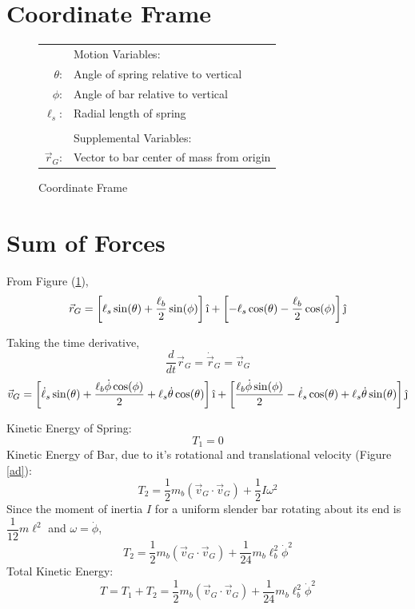 \documentclass[12pt]{report}
\begin{document}
\begin{flushleft}
\section{Coordinate Frame} \label{section:coord}
\begin{figure}[!htp]
    \begin{minipage}[c]{.4\textwidth}
      \center
      
      \caption{Coordinate Frame}
      \label{coord}
      \vspace{2ex}
    \end{minipage}%
    \begin{minipage}[c]{.6\textwidth}
      \center
      \begin{tabular}{rl}
      & \quad Motion Variables: \\
      $\theta$:& Angle of spring relative to vertical\\
      $\phi$:& Angle of bar relative to vertical\\
      $\ell_s$:& Radial length of spring \\
      \\
      & \quad Supplemental Variables: \\
      $\vec{r}_G$:& Vector to bar center of mass from origin \\
    \end{tabular}
    \end{minipage}
\end{figure}
\section{Sum of Forces}
From Figure (\ref{coord}),
$$\vec{r}_G = \left[\ell_s\sin(\theta) + \frac{\ell_b}{2}\sin(\phi)\right]\hat{\textrm{\i}}
 + \left[-\ell_s\cos(\theta) - \frac{\ell_b}{2}\cos(\phi)\right]\hat{\textrm{\j}}$$

Taking the time derivative,
$$\frac{d}{dt}\vec{r}_G = \dot{\vec{r}}_G = \vec{v}_G$$
$$
\vec{v}_G =
\left[\dot{\ell}_s\sin(\theta) + \frac{\ell_b\dot{\phi}\cos(\phi)}{2} +
\ell_s\dot{\theta}\cos(\theta)\right]\hat{\textrm{\i}} +
\left[\frac{\ell_b\dot{\phi}\sin(\phi)}{2} -
\dot{\ell}_s\cos(\theta) + \ell_s\dot{\theta}\sin(\theta)\right]\hat{\textrm{\j}}
$$

Kinetic Energy of Spring:
$$T_1 = 0$$
Kinetic Energy of Bar, due to it's rotational and translational velocity (Figure \ref{ad}):
$$T_2 = \frac{1}{2}m_{b}(\vec{v}_G \cdot \vec{v}_G) + \frac{1}{2}I\omega^2$$
Since the moment of inertia $I$ for a uniform slender bar rotating about its end is
$\dfrac{1}{12}m\ell^2$ and $\omega = \dot{\phi}$,
$$T_2 = \frac{1}{2}m_{b}(\vec{v}_G \cdot \vec{v}_G) + \frac{1}{24}m_{b}\ell_b^2\dot{\phi}^2$$
Total Kinetic Energy:
\begin{equation}
T = T_1 + T_2 = \frac{1}{2}m_{b}(\vec{v}_G \cdot \vec{v}_G) + \frac{1}{24}m_{b}\ell_b^2\dot{\phi}^2
\end{equation}


\end{flushleft}
\end{document}
